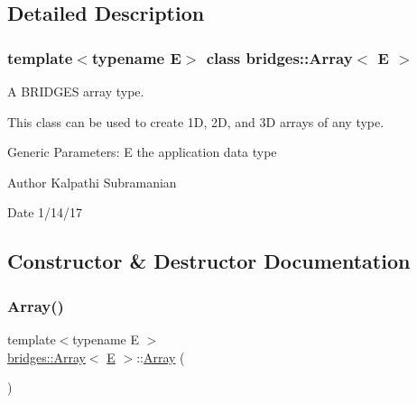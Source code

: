 \subsection{Detailed Description}
\subsubsection*{template$<$typename E$>$\newline
class bridges\+::\+Array$<$ E $>$}

A B\+R\+I\+D\+G\+ES array type. 

This class can be used to create 1D, 2D, and 3D arrays of any type.

Generic Parameters\+: E the application data type

\begin{DoxyAuthor}{Author}
Kalpathi Subramanian 
\end{DoxyAuthor}
\begin{DoxyDate}{Date}
1/14/17 
\end{DoxyDate}


\subsection{Constructor \& Destructor Documentation}
\mbox{\label{classbridges_1_1_array_a958421b86ff55303b5fc7d505109f9fe}} 
\subsubsection{\texorpdfstring{Array()}{Array()}\hspace{0.1cm}{\footnotesize\ttfamily [1/6]}}
{\footnotesize\ttfamily template$<$typename E $>$ \\
\mbox{\hyperlink{classbridges_1_1_array}{bridges\+::\+Array}}$<$ \mbox{\hyperlink{namespacebridges_acfb0a4f7877d8f63de3e6862004c50eda3a3ea00cfc35332cedf6e5e9a32e94da}{E}} $>$\+::\mbox{\hyperlink{classbridges_1_1_array}{Array}} (\begin{DoxyParamCaption}{ }\end{DoxyParamCaption})\hspace{0.3cm}{\ttfamily [inline]}}

\mbox{\label{classbridges_1_1_array_aa80b2d2ebc4c27e74a8eaaeb6907b474}} 
